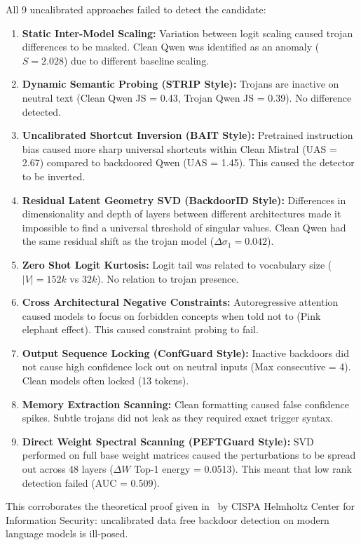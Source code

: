All 9 uncalibrated approaches failed to detect the candidate:
\begin{enumerate}
    \item \textbf{Static Inter-Model Scaling:} Variation between logit scaling caused trojan differences to be masked. Clean Qwen was identified as an anomaly ($S = 2.028$) due to different baseline scaling.
    \item \textbf{Dynamic Semantic Probing (STRIP Style):} Trojans are inactive on neutral text (Clean Qwen JS = 0.43, Trojan Qwen JS = 0.39). No difference detected.
    \item \textbf{Uncalibrated Shortcut Inversion (BAIT Style):} Pretrained instruction bias caused more sharp universal shortcuts within Clean Mistral (UAS = 2.67) compared to backdoored Qwen (UAS = 1.45). This caused the detector to be inverted.
    \item \textbf{Residual Latent Geometry SVD (BackdoorID Style):} Differences in dimensionality and depth of layers between different architectures made it impossible to find a universal threshold of singular values. Clean Qwen had the same residual shift as the trojan model ($\Delta \sigma_1 = 0.042$).
    \item \textbf{Zero Shot Logit Kurtosis:} Logit tail was related to vocabulary size ($|V| = 152k$ vs $32k$). No relation to trojan presence.
    \item \textbf{Cross Architectural Negative Constraints:} Autoregressive attention caused models to focus on forbidden concepts when told not to (Pink elephant effect). This caused constraint probing to fail.
    \item \textbf{Output Sequence Locking (ConfGuard Style):} Inactive backdoors did not cause high confidence lock out on neutral inputs (Max consecutive = 4). Clean models often locked (13 tokens).
    \item \textbf{Memory Extraction Scanning:} Clean formatting caused false confidence spikes. Subtle trojans did not leak as they required exact trigger syntax.
    \item \textbf{Direct Weight Spectral Scanning (PEFTGuard Style):} SVD performed on full base weight matrices caused the perturbations to be spread out across 48 layers ($\Delta W$ Top-1 energy = 0.0513). This meant that low rank detection failed (AUC = 0.509).
\end{enumerate}

This corroborates the theoretical proof given in~\cite{cispa2026datafree} by CISPA Helmholtz Center for Information Security: uncalibrated data free backdoor detection on modern language models is ill-posed.

